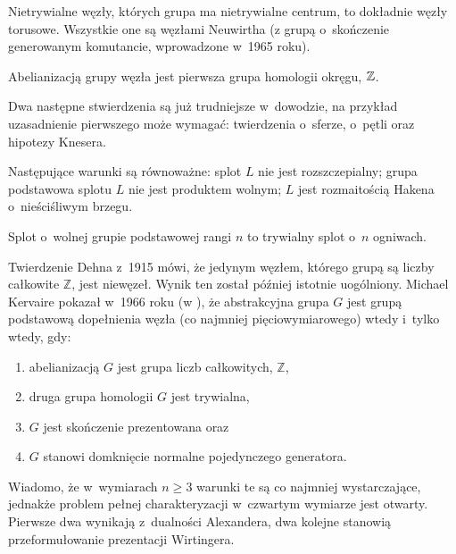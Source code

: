 
Nietrywialne węzły, których grupa ma nietrywialne centrum, to dokładnie węzły torusowe.
Wszystkie one są węzłami Neuwirtha
(z grupą o~skończenie generowanym komutancie, wprowadzone w~1965 roku).

\begin{corollary}
    \label{prop:knot_group_abelianisation}
    Abelianizacją grupy węzła jest pierwsza grupa homologii okręgu, $\mathbb Z$.
\end{corollary}

Dwa następne stwierdzenia są już trudniejsze w~dowodzie,
na przykład uzasadnienie pierwszego może wymagać:
twierdzenia o~sferze, o~pętli oraz hipotezy Knesera.

\begin{proposition}
    \label{prop:knot_group_split}
    Następujące warunki są równoważne:
    splot $L$ nie jest rozszczepialny;
    grupa podstawowa splotu $L$ nie jest produktem wolnym;
    $L$ jest rozmaitością Hakena o~nieściśliwym brzegu.
\end{proposition}

\begin{proposition}
    \label{prop:knot_group_free}
    Splot o~wolnej grupie podstawowej rangi $n$ to trywialny splot o~$n$ ogniwach.
\end{proposition}

Twierdzenie Dehna z~1915 mówi, że jedynym węzłem,
którego grupą są liczby całkowite $\mathbb Z$, jest niewęzeł.
Wynik ten został później istotnie uogólniony.
Michael Kervaire pokazał w~1966 roku (w \cite{kervaire65}),
że abstrakcyjna grupa $G$ jest grupą podstawową dopełnienia węzła
(co najmniej pięciowymiarowego) wtedy i~tylko wtedy, gdy:
\begin{enumerate}[leftmargin=*]
    \itemsep0em
    \item abelianizacją $G$ jest grupa liczb całkowitych, $\mathbb Z$,
    \item druga grupa homologii $G$ jest trywialna,
    \item $G$ jest skończenie prezentowana oraz
    \item $G$ stanowi domknięcie normalne pojedynczego generatora.
\end{enumerate}

Wiadomo, że w~wymiarach $n \ge 3$ warunki te są co najmniej wystarczające,
jednakże problem  pełnej charakteryzacji w~czwartym wymiarze jest otwarty.
Pierwsze dwa wynikają z~dualności Alexandera,
dwa kolejne stanowią przeformułowanie prezentacji Wirtingera.

